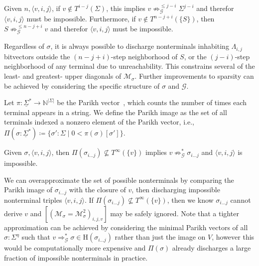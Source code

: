 \documentclass[sigplan,review,anonymous,acmsmall]{acmart}\settopmatter{printfolios=false,printccs=false,printacmref=false}
\begin{document}
\begin{lemma}
  Given $n, \langle v, i, j \rangle$, if $v \notin T^{i-j}(\Sigma)$, this implies $v\not\Rightarrow^{\leq j-i}_\mathcal{G} \Sigma^{j-i}$ and therefor $\langle v, i, j \rangle$ must be impossible. Furthermore, if $v \notin T^{n-j+i}(\{S\})$, then $S\not\Rightarrow^{\leq n-j+i}_\mathcal{G} v$ and therefor $\langle v, i, j \rangle$ must be impossible.
\end{lemma}

Regardless of $\sigma$, it is always possible to discharge nonterminals inhabiting $\Lambda_{i, j}$ bitvectors outside the $(n-j+i)$-step neighborhood of $S$, or the $(j-i)$-step neighborhood of any terminal due to unreachability. This constrains several of the least- and greatest- upper diagonals of $\mathcal{M}_\sigma$. Further improvements to sparsity can be achieved by considering the specific structure of $\sigma$ and $\mathcal{G}$.

\begin{definition}
  Let $\pi: \underline\Sigma^*\rightarrow\mathbb{N}^{|\Sigma|}$ be the Parikh vector~\cite{parikh1966context}, which counts the number of times each terminal appears in a string. We define the Parikh image as the set of all terminals indexed a nonzero element of the Parikh vector, i.e., $\Pi(\sigma:\underline\Sigma^*) \coloneq \{\sigma': \Sigma \mid 0 < \pi(\sigma)[\sigma']\}$. %
\end{definition}

\begin{lemma}
Given $\sigma, \langle v, i, j \rangle$, then $\Pi(\sigma_{i\ldots j}) \not\subseteq T^\infty(\{v\})$ implies $v\not\Rightarrow^*_\mathcal{G} \sigma_{i\ldots j}$ and $\langle v, i, j \rangle$ is impossible.
\end{lemma}

We can overapproximate the set of possible nonterminals by comparing the Parikh image of $\sigma_{i\ldots j}$ with the closure of $v$, then discharging impossible nonterminal triples $\langle v, i, j \rangle$. If $\Pi(\sigma_{i\ldots j}) \not\subseteq T^\infty(\{v\})$, then we know $\sigma_{i\ldots j}$ cannot derive $v$ and $\left[(\mathcal{M}_{\sigma} = \mathcal{M}_{\sigma}^2)_{i, j, v}\right]$ may be safely ignored. Note that a tighter approximation can be achieved by considering the minimal Parikh vectors of all $\sigma: \Sigma^\eta$ such that $v \Rightarrow_\mathcal{G}^* \sigma \in \text{H}(\sigma_{i\ldots j})$ rather than just the image on $V$, however this would be computationally more expensive and $\Pi(\sigma)$ already discharges a large fraction of impossible nonterminals in practice.
\end{document}
